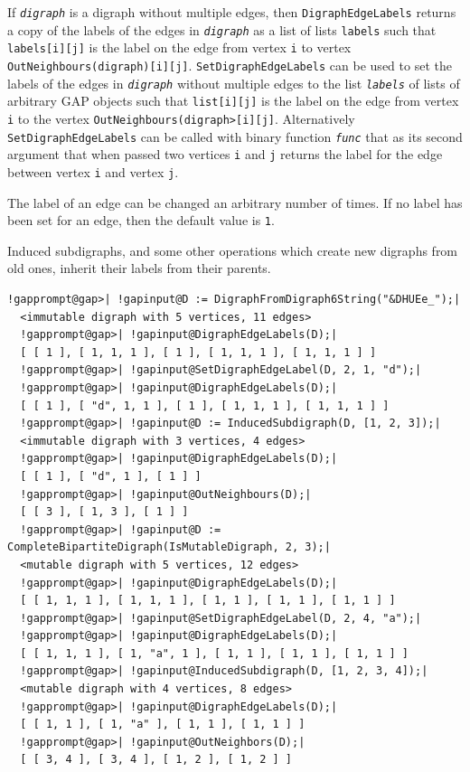 \documentclass[a4paper,11pt]{report}
\begin{document}
{{{ If \mbox{\texttt{\mdseries\slshape digraph}} is a digraph without multiple edges, then \texttt{DigraphEdgeLabels} returns a copy of the labels of the edges in \mbox{\texttt{\mdseries\slshape digraph}} as a list of lists \texttt{labels} such that \texttt{labels[i][j]} is the label on the edge from vertex \texttt{i} to vertex \texttt{OutNeighbours(digraph)[i][j]}. \texttt{SetDigraphEdgeLabels} can be used to set the labels of the edges in \mbox{\texttt{\mdseries\slshape digraph}} without multiple edges to the list \mbox{\texttt{\mdseries\slshape labels}} of lists of arbitrary \textsf{GAP} objects such that \texttt{list[i][j]} is the label on the edge from vertex \texttt{i} to the vertex \texttt{OutNeighbours(digraph{\textgreater}[i][j]}. Alternatively \texttt{SetDigraphEdgeLabels} can be called with binary function \mbox{\texttt{\mdseries\slshape func}} that as its second argument that when passed two vertices \texttt{i} and \texttt{j} returns the label for the edge between vertex \texttt{i} and vertex \texttt{j}. 

 The label of an edge can be changed an arbitrary number of times. If no label
has been set for an edge, then the default value is \texttt{1}. 

 Induced subdigraphs, and some other operations which create new digraphs from
old ones, inherit their labels from their parents. 
\begin{Verbatim}[commandchars=!@|,fontsize=\small,frame=single,label=Example]
  !gapprompt@gap>| !gapinput@D := DigraphFromDigraph6String("&DHUEe_");|
  <immutable digraph with 5 vertices, 11 edges>
  !gapprompt@gap>| !gapinput@DigraphEdgeLabels(D);|
  [ [ 1 ], [ 1, 1, 1 ], [ 1 ], [ 1, 1, 1 ], [ 1, 1, 1 ] ]
  !gapprompt@gap>| !gapinput@SetDigraphEdgeLabel(D, 2, 1, "d");|
  !gapprompt@gap>| !gapinput@DigraphEdgeLabels(D);|
  [ [ 1 ], [ "d", 1, 1 ], [ 1 ], [ 1, 1, 1 ], [ 1, 1, 1 ] ]
  !gapprompt@gap>| !gapinput@D := InducedSubdigraph(D, [1, 2, 3]);|
  <immutable digraph with 3 vertices, 4 edges>
  !gapprompt@gap>| !gapinput@DigraphEdgeLabels(D);|
  [ [ 1 ], [ "d", 1 ], [ 1 ] ]
  !gapprompt@gap>| !gapinput@OutNeighbours(D);|
  [ [ 3 ], [ 1, 3 ], [ 1 ] ]
  !gapprompt@gap>| !gapinput@D := CompleteBipartiteDigraph(IsMutableDigraph, 2, 3);|
  <mutable digraph with 5 vertices, 12 edges>
  !gapprompt@gap>| !gapinput@DigraphEdgeLabels(D);|
  [ [ 1, 1, 1 ], [ 1, 1, 1 ], [ 1, 1 ], [ 1, 1 ], [ 1, 1 ] ]
  !gapprompt@gap>| !gapinput@SetDigraphEdgeLabel(D, 2, 4, "a");|
  !gapprompt@gap>| !gapinput@DigraphEdgeLabels(D);|
  [ [ 1, 1, 1 ], [ 1, "a", 1 ], [ 1, 1 ], [ 1, 1 ], [ 1, 1 ] ]
  !gapprompt@gap>| !gapinput@InducedSubdigraph(D, [1, 2, 3, 4]);|
  <mutable digraph with 4 vertices, 8 edges>
  !gapprompt@gap>| !gapinput@DigraphEdgeLabels(D);|
  [ [ 1, 1 ], [ 1, "a" ], [ 1, 1 ], [ 1, 1 ] ]
  !gapprompt@gap>| !gapinput@OutNeighbors(D);|
  [ [ 3, 4 ], [ 3, 4 ], [ 1, 2 ], [ 1, 2 ] ]
\end{Verbatim}
 }

}}
\end{document}
